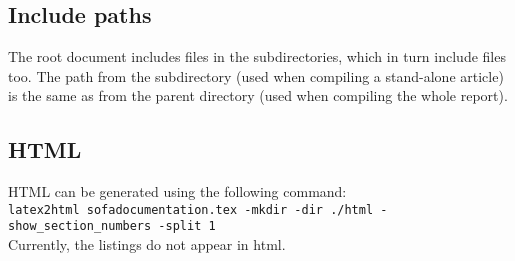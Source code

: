 \documentclass[a4paper,10pt]{report}
\begin{document}
\subsection{Include paths}
The root document includes files in the subdirectories, which in turn include files too. The path from the subdirectory (used when compiling a stand-alone article) is the same as from the parent directory (used when compiling the whole report).

\subsection{HTML}
HTML can be generated using the following command:\\
\texttt{latex2html sofadocumentation.tex -mkdir -dir ./html -show\_section\_numbers -split 1}
\\
Currently, the listings do not appear in html.



\end{document}
